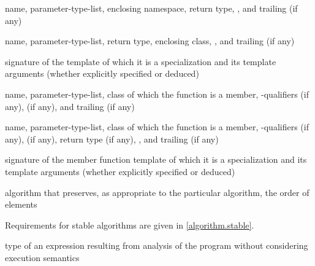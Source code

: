 %
name,
parameter-type-list,
enclosing namespace,
return type,
,
and
trailing  (if any)

%
name,
parameter-type-list,
return type,
enclosing class,
,
and
trailing  (if any)

%
 signature of the template of which it is a specialization
and its template arguments (whether explicitly specified or deduced)

%
name,
parameter-type-list,
class of which the function is a member,
\cv-qualifiers (if any),
 (if any),
and
trailing  (if any)

%
name,
parameter-type-list,
class of which the function is a member,
\cv-qualifiers (if any),
 (if any),
return type (if any),
,
and
trailing  (if any)

%
 signature of the member function template
of which it is a specialization and its template arguments (whether explicitly specified or deduced)

%
%
algorithm that preserves, as appropriate to the particular algorithm, the order
of elements

\begin{defnote}
Requirements for stable algorithms are given in \ref{algorithm.stable}.
\end{defnote}

%
type of an expression resulting from
analysis of the program without considering execution semantics

